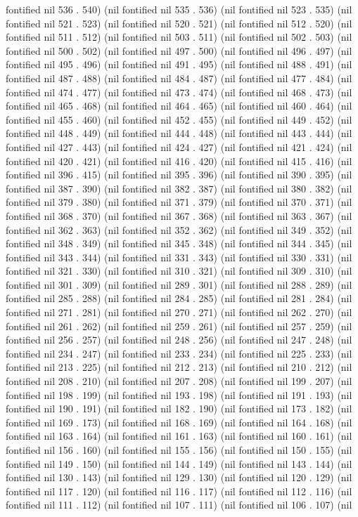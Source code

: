 fontified nil 536 . 540) (nil fontified nil 535 . 536) (nil fontified nil 523 . 535) (nil fontified nil 521 . 523) (nil fontified nil 520 . 521) (nil fontified nil 512 . 520) (nil fontified nil 511 . 512) (nil fontified nil 503 . 511) (nil fontified nil 502 . 503) (nil fontified nil 500 . 502) (nil fontified nil 497 . 500) (nil fontified nil 496 . 497) (nil fontified nil 495 . 496) (nil fontified nil 491 . 495) (nil fontified nil 488 . 491) (nil fontified nil 487 . 488) (nil fontified nil 484 . 487) (nil fontified nil 477 . 484) (nil fontified nil 474 . 477) (nil fontified nil 473 . 474) (nil fontified nil 468 . 473) (nil fontified nil 465 . 468) (nil fontified nil 464 . 465) (nil fontified nil 460 . 464) (nil fontified nil 455 . 460) (nil fontified nil 452 . 455) (nil fontified nil 449 . 452) (nil fontified nil 448 . 449) (nil fontified nil 444 . 448) (nil fontified nil 443 . 444) (nil fontified nil 427 . 443) (nil fontified nil 424 . 427) (nil fontified nil 421 . 424) (nil fontified nil 420 . 421) (nil fontified nil 416 . 420) (nil fontified nil 415 . 416) (nil fontified nil 396 . 415) (nil fontified nil 395 . 396) (nil fontified nil 390 . 395) (nil fontified nil 387 . 390) (nil fontified nil 382 . 387) (nil fontified nil 380 . 382) (nil fontified nil 379 . 380) (nil fontified nil 371 . 379) (nil fontified nil 370 . 371) (nil fontified nil 368 . 370) (nil fontified nil 367 . 368) (nil fontified nil 363 . 367) (nil fontified nil 362 . 363) (nil fontified nil 352 . 362) (nil fontified nil 349 . 352) (nil fontified nil 348 . 349) (nil fontified nil 345 . 348) (nil fontified nil 344 . 345) (nil fontified nil 343 . 344) (nil fontified nil 331 . 343) (nil fontified nil 330 . 331) (nil fontified nil 321 . 330) (nil fontified nil 310 . 321) (nil fontified nil 309 . 310) (nil fontified nil 301 . 309) (nil fontified nil 289 . 301) (nil fontified nil 288 . 289) (nil fontified nil 285 . 288) (nil fontified nil 284 . 285) (nil fontified nil 281 . 284) (nil fontified nil 271 . 281) (nil fontified nil 270 . 271) (nil fontified nil 262 . 270) (nil fontified nil 261 . 262) (nil fontified nil 259 . 261) (nil fontified nil 257 . 259) (nil fontified nil 256 . 257) (nil fontified nil 248 . 256) (nil fontified nil 247 . 248) (nil fontified nil 234 . 247) (nil fontified nil 233 . 234) (nil fontified nil 225 . 233) (nil fontified nil 213 . 225) (nil fontified nil 212 . 213) (nil fontified nil 210 . 212) (nil fontified nil 208 . 210) (nil fontified nil 207 . 208) (nil fontified nil 199 . 207) (nil fontified nil 198 . 199) (nil fontified nil 193 . 198) (nil fontified nil 191 . 193) (nil fontified nil 190 . 191) (nil fontified nil 182 . 190) (nil fontified nil 173 . 182) (nil fontified nil 169 . 173) (nil fontified nil 168 . 169) (nil fontified nil 164 . 168) (nil fontified nil 163 . 164) (nil fontified nil 161 . 163) (nil fontified nil 160 . 161) (nil fontified nil 156 . 160) (nil fontified nil 155 . 156) (nil fontified nil 150 . 155) (nil fontified nil 149 . 150) (nil fontified nil 144 . 149) (nil fontified nil 143 . 144) (nil fontified nil 130 . 143) (nil fontified nil 129 . 130) (nil fontified nil 120 . 129) (nil fontified nil 117 . 120) (nil fontified nil 116 . 117) (nil fontified nil 112 . 116) (nil fontified nil 111 . 112) (nil fontified nil 107 . 111) (nil fontified nil 106 . 107) (nil 